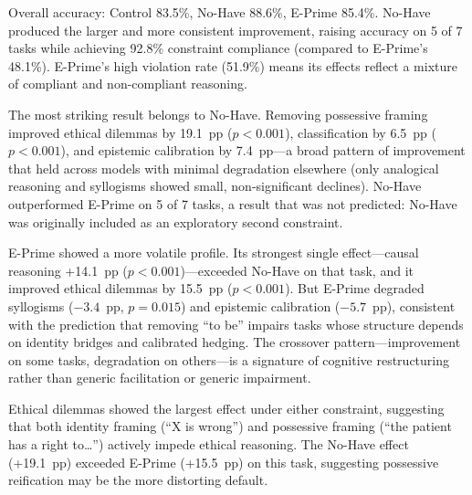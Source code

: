 \documentclass[11pt,a4paper]{article}
\begin{document}
Overall accuracy: Control 83.5\%, No-Have 88.6\%, E-Prime 85.4\%. No-Have produced the larger and more consistent improvement, raising accuracy on 5 of 7 tasks while achieving 92.8\% constraint compliance (compared to E-Prime's 48.1\%). E-Prime's high violation rate (51.9\%) means its effects reflect a mixture of compliant and non-compliant reasoning.

The most striking result belongs to No-Have. Removing possessive framing improved ethical dilemmas by 19.1~pp ($p < 0.001$), classification by 6.5~pp ($p < 0.001$), and epistemic calibration by 7.4~pp---a broad pattern of improvement that held across models with minimal degradation elsewhere (only analogical reasoning and syllogisms showed small, non-significant declines). No-Have outperformed E-Prime on 5 of 7 tasks, a result that was not predicted: No-Have was originally included as an exploratory second constraint.

E-Prime showed a more volatile profile. Its strongest single effect---causal reasoning +14.1~pp ($p < 0.001$)---exceeded No-Have on that task, and it improved ethical dilemmas by 15.5~pp ($p < 0.001$). But E-Prime degraded syllogisms ($-3.4$~pp, $p = 0.015$) and epistemic calibration ($-5.7$~pp), consistent with the prediction that removing ``to be'' impairs tasks whose structure depends on identity bridges and calibrated hedging. The crossover pattern---improvement on some tasks, degradation on others---is a signature of cognitive restructuring rather than generic facilitation or generic impairment.

Ethical dilemmas showed the largest effect under either constraint, suggesting that both identity framing (``X is wrong'') and possessive framing (``the patient has a right to\ldots'') actively impede ethical reasoning. The No-Have effect (+19.1~pp) exceeded E-Prime (+15.5~pp) on this task, suggesting possessive reification may be the more distorting default.
\end{document}
